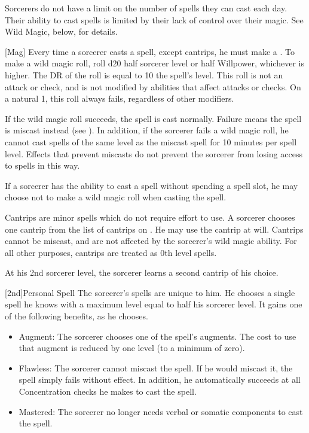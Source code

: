         Sorcerers do not have a limit on the number of spells they can cast each day.
        Their ability to cast spells is limited by their lack of control over their magic.
        See Wild Magic, below, for details.

        [Mag]\label{Wild Magic}
        Every time a sorcerer casts a spell, except cantrips, he must make a .
        To make a wild magic roll, roll d20 \add half sorcerer level or half Willpower, whichever is higher.
        The DR of the roll is equal to 10 \add the spell's level.
        This roll is not an attack or check, and is not modified by abilities that affect attacks or checks.
        On a natural 1, this roll always fails, regardless of other modifiers.

        If the wild magic roll succeeds, the spell is cast normally.
        Failure means the spell is miscast instead (see ).
        In addition, if the sorcerer fails a wild magic roll, he cannot cast spells of the same level as the miscast spell for 10 minutes per spell level.
        Effects that prevent miscasts do not prevent the sorcerer from losing access to spells in this way.

        If a sorcerer has the ability to cast a spell without spending a spell slot, he may choose not to make a wild magic roll when casting the spell.

        Cantrips are minor spells which do not require effort to use.
        A sorcerer chooses one cantrip from the list of cantrips on .
        He may use the cantrip at will.
        Cantrips cannot be miscast, and are not affected by the sorcerer's wild magic ability.
        For all other purposes, cantrips are treated as 0th level spells.

        At his 2nd sorcerer level, the sorcerer learns a second cantrip of his choice.

        [2nd]{Personal Spell}
        The sorcerer's spells are unique to him.
        He chooses a single spell he knows with a maximum level equal to half his sorcerer level.
        It gains one of the following benefits, as he chooses.
        \begin{itemize}
            \item Augment: The sorcerer chooses one of the spell's augments.
                The cost to use that augment is reduced by one level (to a minimum of zero).
            \item Flawless: The sorcerer cannot miscast the spell.
                If he would miscast it, the spell simply fails without effect.
                In addition, he automatically succeeds at all Concentration checks he makes to cast the spell.
            \item Mastered: The sorcerer no longer needs verbal or somatic components to cast the spell.
        \end{itemize}

